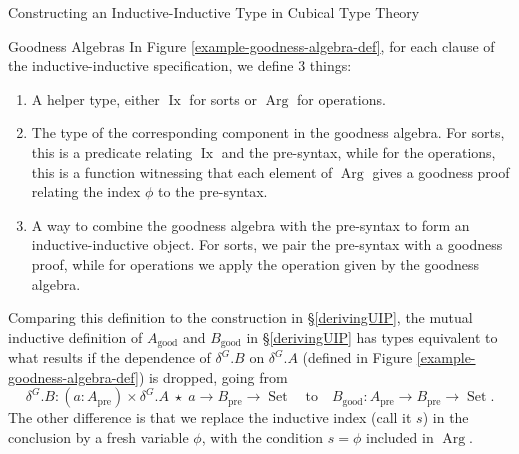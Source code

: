 \documentclass[runningheads]{llncs}
\newcommand{\erase}[1]{{}}
\DeclareMathOperator{\USet}{Set}
\DeclareMathOperator{\Arg}{Arg}
\DeclareMathOperator{\Ix}{Ix}
\newcommand{\pre}[1]{{#1}_\text{pre}}
\newcommand{\good}[1]{{#1}_\text{good}}
\begin{document}
\begin{section}{Constructing an Inductive-Inductive Type in Cubical Type Theory}
\begin{subsection}{Goodness Algebras}
In Figure \ref{example-goodness-algebra-def}, for each clause of the inductive-inductive specification, we define 3 things:
\begin{enumerate}
    \item A helper type, either $\Ix$ for sorts or $\Arg$ for operations.
    \item The type of the corresponding component in the goodness algebra. For sorts, this is a predicate relating $\Ix$ and the pre-syntax, while for the operations, this is a function witnessing that each element of $\Arg$ gives a goodness proof relating the index $\phi$ to the pre-syntax.
    \item A way to combine the goodness algebra with the pre-syntax to form an inductive-inductive object. For sorts, we pair the pre-syntax with a goodness proof, while for operations we apply the operation given by the goodness algebra.
\end{enumerate}

Comparing this definition to the construction in \S\ref{derivingUIP}, the mutual inductive definition of $\good{A}$ and $\good{B}$ in \S\ref{derivingUIP} has types equivalent to what results if the dependence of $\delta^G.B$ on $\delta^G.A$ (defined in Figure \ref{example-goodness-algebra-def}) is dropped, going from \[\delta^G.B : (a : \pre{A}) \times \delta^G.A\;\star\;a \to \pre{B} \to \USet \quad\text{to}\quad \good{B} : \pre{A} \to \pre{B} \to \USet.\] The other difference is that we replace the inductive index (call it $s$) in the conclusion by a fresh variable $\phi$, with the condition $s = \phi$ included in $\Arg$.

\erase{
Consider the sort $B$. The inductive index of $B$ is $a : A$, so we set $\Ix B = A$. Our goodness algebra has a predicate $\delta^G.B : \Ix B \to \pre{B} \to \USet$, which defines a relation between the inductive index and the pre-syntax. And we define an elements of $B\;\phi$ to be pairs of pre-syntax with a proof that it is related to $\phi$ by the goodness algebra. The definition of the sort $A$ follows the same pattern, but there $A$ has no inductive index, or rather has $\top$ as the inductive index, so we set $\Ix A = \top$.

}
\end{subsection}
\end{section}
\end{document}
